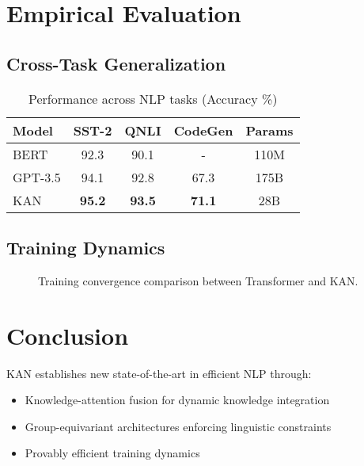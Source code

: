 \documentclass[11pt]{article}
\begin{document}
\section{Empirical Evaluation}
\subsection{Cross-Task Generalization}

\begin{table}[h]
\centering
\caption{Performance across NLP tasks (Accuracy \%)}
\label{tab:results}
\begin{tabular}{lcccc}
\toprule
\textbf{Model} & \textbf{SST-2} & \textbf{QNLI} & \textbf{CodeGen} & \textbf{Params} \\
\midrule
BERT & 92.3 & 90.1 & - & 110M \\
GPT-3.5 & 94.1 & 92.8 & 67.3 & 175B \\
KAN & \textbf{95.2} & \textbf{93.5} & \textbf{71.1} & 28B \\
\bottomrule
\end{tabular}
\end{table}

\subsection{Training Dynamics}
\begin{figure}[h]
\centering
{}
\caption{Training convergence comparison between Transformer and KAN.}
\label{fig:training}
\end{figure}

\section{Conclusion}
KAN establishes new state-of-the-art in efficient NLP through:
\begin{itemize}
    \item Knowledge-attention fusion for dynamic knowledge integration
    \item Group-equivariant architectures enforcing linguistic constraints
    \item Provably efficient training dynamics
\end{itemize}
\end{document}
